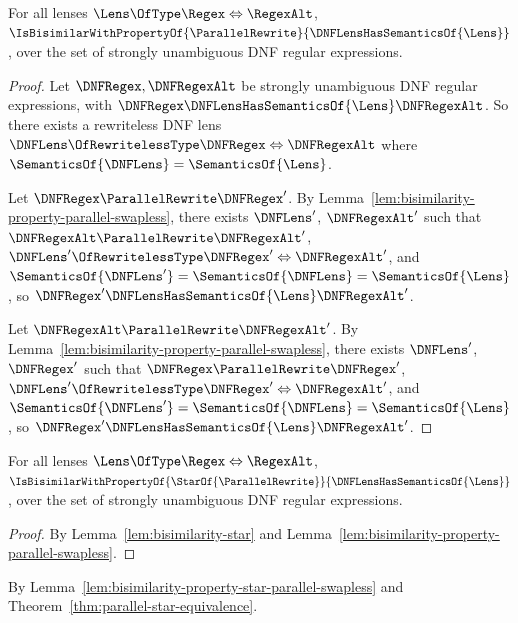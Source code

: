 \documentclass[sigplan,acmsmall]{acmart}
\begin{document}
\begin{lemma}
  \label{lem:bisimilarity-property-parallel-swapless}
  For all lenses $\Lens \OfType \Regex \Leftrightarrow \RegexAlt$,
  $\IsBisimilarWithPropertyOf{\ParallelRewrite}{\DNFLensHasSemanticsOf{\Lens}}$,
  over the set of strongly unambiguous DNF regular expressions.
\end{lemma}
\begin{proof}
  Let $\DNFRegex,\DNFRegexAlt$ be strongly unambiguous DNF regular expressions,
  with $\DNFRegex \DNFLensHasSemanticsOf{\Lens} \DNFRegexAlt$.
  So there exists a rewriteless DNF lens
  $\DNFLens \OfRewritelessType \DNFRegex \Leftrightarrow \DNFRegexAlt$ where
  $\SemanticsOf{\DNFLens} = \SemanticsOf{\Lens}$.

  Let $\DNFRegex \ParallelRewrite \DNFRegex'$.  By
  Lemma~\ref{lem:bisimilarity-property-parallel-swapless}, there exists $\DNFLens'$,
  $\DNFRegexAlt'$ such that $\DNFRegexAlt \ParallelRewrite \DNFRegexAlt'$,
  $\DNFLens' \OfRewritelessType \DNFRegex' \Leftrightarrow \DNFRegexAlt'$,
  and $\SemanticsOf{\DNFLens'} = \SemanticsOf{\DNFLens} = \SemanticsOf{\Lens}$,
  so $\DNFRegex' \DNFLensHasSemanticsOf{\Lens} \DNFRegexAlt'$.

  Let $\DNFRegexAlt \ParallelRewrite \DNFRegexAlt'$.  By
  Lemma~\ref{lem:bisimilarity-property-parallel-swapless}, there exists $\DNFLens'$,
  $\DNFRegex'$ such that $\DNFRegex \ParallelRewrite \DNFRegex'$,
  $\DNFLens' \OfRewritelessType \DNFRegex' \Leftrightarrow \DNFRegexAlt'$,
  and $\SemanticsOf{\DNFLens'} = \SemanticsOf{\DNFLens} = \SemanticsOf{\Lens}$,
  so $\DNFRegex' \DNFLensHasSemanticsOf{\Lens} \DNFRegexAlt'$.
\end{proof}

\begin{lemma}
  \label{lem:bisimilarity-property-star-parallel-swapless}
  For all lenses $\Lens \OfType \Regex \Leftrightarrow \RegexAlt$,
  $\IsBisimilarWithPropertyOf{\StarOf{\ParallelRewrite}}{\DNFLensHasSemanticsOf{\Lens}}$,
  over the set of strongly unambiguous DNF regular expressions.
\end{lemma}
\begin{proof}
  By Lemma~\ref{lem:bisimilarity-star} and
  Lemma~\ref{lem:bisimilarity-property-parallel-swapless}.
\end{proof}

\begin{corollary}
  \label{cor:bisimilarity-star-sequential}
  By Lemma~\ref{lem:bisimilarity-property-star-parallel-swapless} and
  Theorem~\ref{thm:parallel-star-equivalence}.
\end{corollary}
\end{document}
